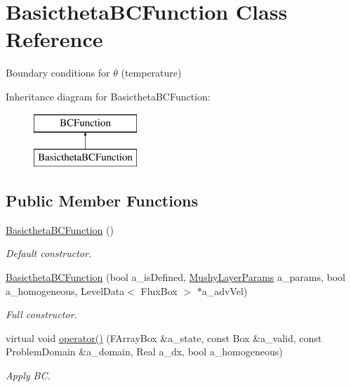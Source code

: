 \hypertarget{class_basictheta_b_c_function}{\section{Basictheta\-B\-C\-Function Class Reference}
\label{class_basictheta_b_c_function}
}


Boundary conditions for $\theta$ (temperature)  


Inheritance diagram for Basictheta\-B\-C\-Function\-:\begin{figure}[H]
\begin{center}
\leavevmode
\includegraphics[height=2.000000cm]{class_basictheta_b_c_function}
\end{center}
\end{figure}
\subsection*{Public Member Functions}
\begin{DoxyCompactItemize}
\item 
\hypertarget{class_basictheta_b_c_function_a35277ba3e564b7518b20ad0b36d8a76e}{\hyperlink{class_basictheta_b_c_function_a35277ba3e564b7518b20ad0b36d8a76e}{Basictheta\-B\-C\-Function} ()}\label{class_basictheta_b_c_function_a35277ba3e564b7518b20ad0b36d8a76e}

\begin{DoxyCompactList}\small\item\em Default constructor. \end{DoxyCompactList}\item 
\hypertarget{class_basictheta_b_c_function_abfd5d610bd584024afd3c4985d54ea89}{\hyperlink{class_basictheta_b_c_function_abfd5d610bd584024afd3c4985d54ea89}{Basictheta\-B\-C\-Function} (bool a\-\_\-is\-Defined, \hyperlink{class_mushy_layer_params}{Mushy\-Layer\-Params} a\-\_\-params, bool a\-\_\-homogeneous, Level\-Data$<$ Flux\-Box $>$ $\ast$a\-\_\-adv\-Vel)}\label{class_basictheta_b_c_function_abfd5d610bd584024afd3c4985d54ea89}

\begin{DoxyCompactList}\small\item\em Full constructor. \end{DoxyCompactList}\item 
\hypertarget{class_basictheta_b_c_function_a79aabf42ad22465a2360db27db2d61b3}{virtual void \hyperlink{class_basictheta_b_c_function_a79aabf42ad22465a2360db27db2d61b3}{operator()} (F\-Array\-Box \&a\-\_\-state, const Box \&a\-\_\-valid, const Problem\-Domain \&a\-\_\-domain, Real a\-\_\-dx, bool a\-\_\-homogeneous)}\label{class_basictheta_b_c_function_a79aabf42ad22465a2360db27db2d61b3}

\begin{DoxyCompactList}\small\item\em Apply B\-C. \end{DoxyCompactList}\end{DoxyCompactItemize}
